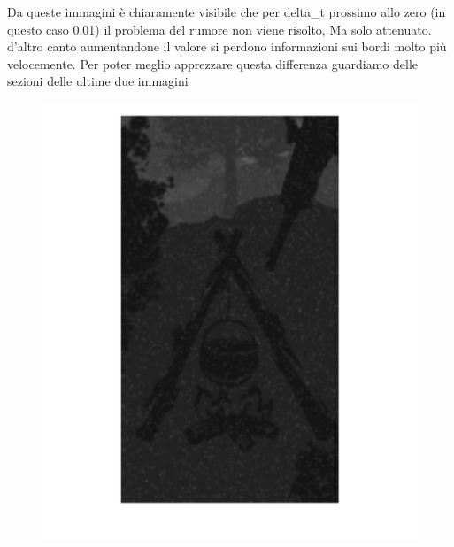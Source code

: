 Da queste immagini è chiaramente visibile che per delta\_t prossimo allo zero (in questo caso 0.01) il problema del rumore non viene risolto, Ma solo attenuato. d'altro canto aumentandone il valore si perdono informazioni sui bordi molto più velocemente. Per poter meglio apprezzare questa differenza guardiamo delle sezioni delle ultime due immagini\\

\begin{figure}[htb] \centering
\includegraphics[scale=0.15]{Pictures/Esempi di utilizzo/Esempio 3/Dettaglio_SfondoForesta_filtrata_deltat0_1.png}

\end{figure}
